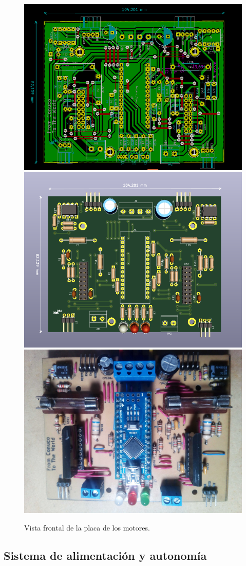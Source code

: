 \begin{figure}[H]
	\centering	
	\includegraphics[width=0.7\linewidth]{imagenes/prototipo/Placa/PCB_FrontAllLayers}	\includegraphics[width=0.7\linewidth]{imagenes/prototipo/Placa/3dViewerFront}
	\includegraphics[width=0.7\linewidth]{imagenes/prototipo/Placa/PCB_FinalFront}
	\caption{Vista frontal de la placa de los motores.}
	\label{imagen:PlacaMotoresFrontal}
\end{figure}

\subsection{Sistema de alimentación y autonomía}

